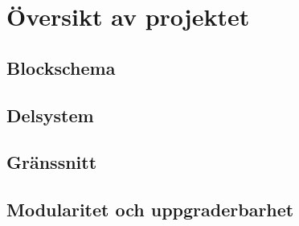 \documentclass[systemskiss/skiss.tex]{subfiles}
\begin{document}
\section{Översikt av projektet}
\subsection{Blockschema}
\subsection{Delsystem}
\subsection{Gränssnitt}
\subsection{Modularitet och uppgraderbarhet}
\end{document}
